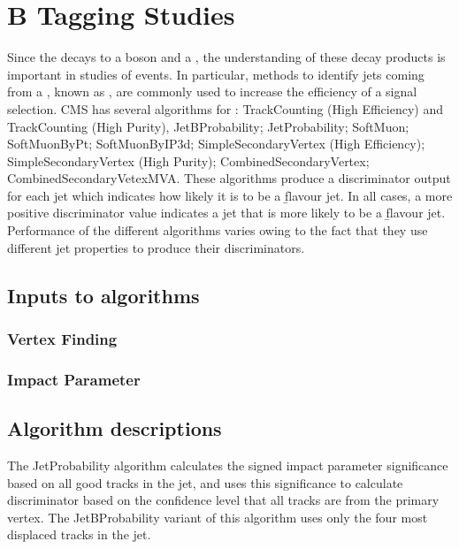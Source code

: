 \chapter{B Tagging Studies}
\label{c:b_tagging_studies}

Since the \tquark decays to a \W boson and a \bquark, the understanding of these decay products is important
in studies of \ttbar events. In particular, methods to identify jets coming from a \bquark, known as
\btagging, are commonly used to increase the efficiency of a signal selection. CMS has several algorithms for
\btagging: TrackCounting (High Efficiency) and TrackCounting (High Purity), JetBProbability; JetProbability;
SoftMuon; SoftMuonByPt; SoftMuonByIP3d; SimpleSecondaryVertex (High Efficiency); SimpleSecondaryVertex (High
Purity); CombinedSecondaryVertex; CombinedSecondaryVetexMVA. These algorithms produce a discriminator output
for each jet which indicates how likely it is to be a \b flavour jet. In all cases, a more positive
discriminator value indicates a jet that is more likely to be a \b flavour jet. Performance of the different
algorithms varies owing to the fact that they use different jet properties to produce their discriminators.

\section{Inputs to \btagging algorithms}
\label{s:inputs_to_btagging_algorithms}

\subsection{Vertex Finding}
\label{ss:vertex_finding}


\subsection{Impact Parameter}
\label{ss:impact_parameter}


\section{Algorithm descriptions}
The JetProbability algorithm calculates the signed impact parameter significance based on all good tracks in
the jet, and uses this significance to calculate discriminator based on the confidence level that all tracks
are from the primary vertex. The JetBProbability variant of this algorithm uses only the four most displaced
tracks in the jet.

